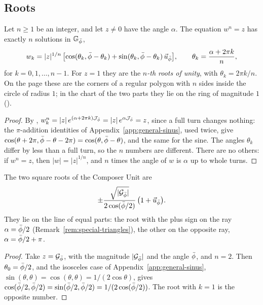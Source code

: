 \subsection{Roots}\label{subsec:gn-roots}

\begin{theorem}\label{thm:gn-roots}
Let $n \geq 1$ be an integer, and let $z \neq 0$ have the angle $\alpha$. The equation $w^n = z$ has exactly $n$ solutions in $\mathbb{G}_{\bar{\phi}}$,
\[
w_k = |z|^{1/n}\,\bigl[\cos(\theta_k, \bar{\phi} - \theta_k) + \sin(\theta_k, \bar{\phi} - \theta_k)\,\vec{u}_{\bar{\phi}}\bigr] , \qquad \theta_k = \frac{\alpha + 2\pi k}{n} ,
\]
for $k = 0, 1, \dots, n - 1$. For $z = 1$ they are the \emph{$n$-th roots of unity}, with $\theta_k = 2\pi k/n$. On the page these are the corners of a regular polygon with $n$ sides inside the circle of radius $1$; in the chart of the two parts they lie on the ring of magnitude $1$ ().
\end{theorem}

\begin{proof}
By , $w_k^n = |z|\,e^{(\alpha + 2\pi k)\mathcal{J}_{\bar{\phi}}} = |z|\,e^{\alpha\mathcal{J}_{\bar{\phi}}} = z$, since a full turn changes nothing: the $\pi$-addition identities of Appendix~\ref{app:general-sinus}, used twice, give $\cos(\theta + 2\pi, \bar{\phi} - \theta - 2\pi) = \cos(\theta, \bar{\phi} - \theta)$, and the same for the sine. The angles $\theta_k$ differ by less than a full turn, so the $n$ numbers are different. There are no others: if $w^n = z$, then $|w| = |z|^{1/n}$, and $n$ times the angle of $w$ is $\alpha$ up to whole turns.
\end{proof}

\begin{corollary}\label{cor:gn-sqrt}
The two square roots of the Composer Unit are
\[
\pm\frac{\sqrt{|\mathcal{G}_{\bar{\phi}}|}}{2\cos(\bar{\phi}/2)}\,\bigl(1 + \vec{u}_{\bar{\phi}}\bigr) .
\]
They lie on the line of equal parts: the root with the plus sign on the ray $\alpha = \bar{\phi}/2$ (Remark~\ref{rem:special-triangles}), the other on the opposite ray, $\alpha = \bar{\phi}/2 + \pi$.
\end{corollary}

\begin{proof}
Take $z = \mathcal{G}_{\bar{\phi}}$, with the magnitude $|\mathcal{G}_{\bar{\phi}}|$ and the angle $\bar{\phi}$, and $n = 2$. Then $\theta_0 = \bar{\phi}/2$, and the isosceles case of Appendix~\ref{app:general-sinus}, $\sin(\theta, \theta) = \cos(\theta, \theta) = 1/(2\cos\theta)$, gives $\cos(\bar{\phi}/2, \bar{\phi}/2) = \sin(\bar{\phi}/2, \bar{\phi}/2) = 1/(2\cos(\bar{\phi}/2))$. The root with $k = 1$ is the opposite number.
\end{proof}

